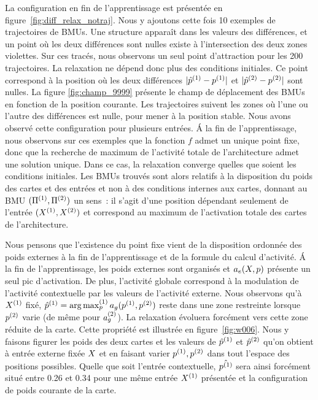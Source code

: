 \documentclass[../main]{subfiles}
\begin{document}
La configuration en fin de l'apprentissage est présentée en figure~\ref{fig:diff_relax_notraj}. Nous y ajoutons cette fois 10 exemples de trajectoires de BMUs.
Une structure apparaît dans les valeurs des différences, et un point où les deux différences sont nulles existe à l'intersection des deux zones violettes.
Sur ces tracés, nous observons un seul point d'attraction pour les 200 trajectoires. La relaxation ne dépend donc plus des conditions initiales.
Ce point correspond à la position où les deux différences $\lvert \hat{p}^{({1})} - p^{({1})} \rvert$ et $\lvert \hat{p}^{({2})} - p^{({2})}\rvert$ sont nulles.
La figure \ref{fig:champ_9999} présente le champ de déplacement des BMUs en fonction de la position courante. Les trajectoires suivent les zones où l'une ou l'autre des différences est nulle, pour mener à la position stable. 
Nous avons observé cette configuration pour plusieurs entrées.
\'A la fin de l'apprentissage, nous observons sur ces exemples que la fonction $f$ admet un unique point fixe, donc que la recherche de maximum de l'activité totale de l'architecture admet une solution unique.
 Dans ce cas, la relaxation converge quelles que soient les conditions initiales. Les BMUs trouvés sont alors relatifs à la disposition du poids des cartes et des entrées et non à des conditions internes aux cartes, donnant au BMU $(\Pi^{({1})},\Pi^{({2})})$ un sens~: il s'agit d'une position dépendant seulement de l'entrée $(X^{({1})},X^{({2})})$ et correspond au maximum de l'activation totale des cartes de l'architecture.

Nous pensons que l'existence du point fixe vient de la disposition ordonnée des poids externes à la fin de l'apprentissage et de la formule du calcul d'activité.
\'A la fin de l'apprentissage, les poids externes sont organisés et $a_e(X,p)$ présente un seul pic d'activation.
De plus, l'activité globale correspond à la modulation de l'activité contextuelle par les valeurs de l'activité externe. 
Nous observons qu'à $X^{({1})}$ fixé, $\hat{p}^{({1})} = \operatorname*{arg\,max}_p^{({1})} a_g(p^{({1})}, p^{({2})})$ reste dans une zone restreinte lorsque $p^{({2})}$ varie (de même pour $a_g^{({2})}$). 
La relaxation évoluera forcément vers cette zone réduite de la carte.
Cette propriété est illustrée en figure~\ref{fig:w006}.
Nous y faisons figurer les poids des deux cartes et les valeurs de $\hat{p}^{({1})}$ et $\hat{p}^{({2})}$ qu'on obtient à entrée externe fixée $X$ et en faisant varier $p^{({1})}, p^{({2})}$ dans tout l'espace des positions possibles. Quelle que soit l'entrée contextuelle, $\hat{p^{({1})}}$ sera ainsi forcément situé entre 0.26 et 0.34 pour une même entrée $X^{({1})}$ présentée et la configuration de poids courante de la carte.
\end{document}

